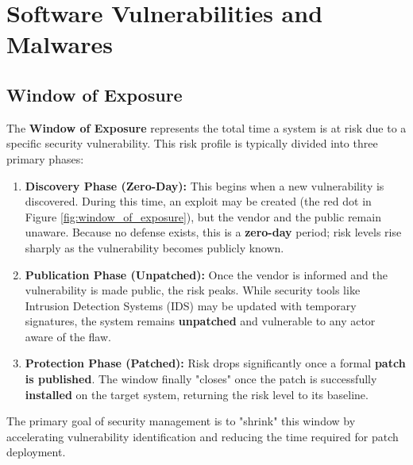 \section{Software Vulnerabilities and Malwares}

\subsection{Window of Exposure}
The \textbf{Window of Exposure} represents the total time a system is at risk due to a specific security vulnerability. This risk profile is typically divided into three primary phases:

\begin{enumerate}
    \item \textbf{Discovery Phase (Zero-Day):} This begins when a new vulnerability is discovered. During this time, an exploit may be created (the red dot in Figure \ref{fig:window_of_exposure}), but the vendor and the public remain unaware. Because no defense exists, this is a \textbf{zero-day} period; risk levels rise sharply as the vulnerability becomes publicly known.
    \item \textbf{Publication Phase (Unpatched):} Once the vendor is informed and the vulnerability is made public, the risk peaks. While security tools like Intrusion Detection Systems (IDS) may be updated with temporary signatures, the system remains \textbf{unpatched} and vulnerable to any actor aware of the flaw.
    \item \textbf{Protection Phase (Patched):} Risk drops significantly once a formal \textbf{patch is published}. The window finally "closes" once the patch is successfully \textbf{installed} on the target system, returning the risk level to its baseline.
\end{enumerate}

\label{fig:window_of_exposure}

The primary goal of security management is to "shrink" this window by accelerating vulnerability identification and reducing the time required for patch deployment.


